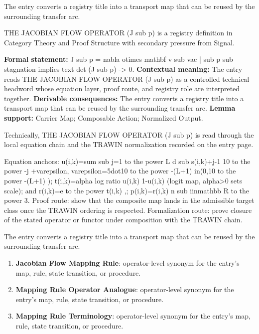 The entry converts a registry title into a transport map that can be reused by the surrounding transfer arc.
\clearpage


\begingroup\small
{}
THE JACOBIAN FLOW OPERATOR (J sub p) is a registry definition in Category Theory and Proof Structure with secondary pressure from Signal.

\begingroup\footnotesize\setlength{\emergencystretch}{3em}\sloppy
\textbf{Formal statement:} J sub p = nabla otimes mathbf v sub vac | sub p sub stagnation implies text det (J sub p) -> 0. \textbf{Contextual meaning:} The entry reads THE JACOBIAN FLOW OPERATOR (J sub p) as a controlled technical headword whose equation layer, proof route, and registry role are interpreted together. \textbf{Derivable consequences:} The entry converts a registry title into a transport map that can be reused by the surrounding transfer arc. \textbf{Lemma support:} Carrier Map; Composable Action; Normalized Output.\par
\endgroup

Technically, THE JACOBIAN FLOW OPERATOR (J sub p) is read through the local equation chain and the TRAWIN normalization recorded on the entry page.

Equation anchors: u(i,k)=sum sub j=1 to the power L d sub s(i,k)+j-1 10 to the power -j +varepsilon, varepsilon=5dot10 to the power -(L+1) in(0,10 to the power -(L+1) ); t(i,k)=alpha log ratio u(i,k) 1-u(i,k) (logit map, alpha>0 sets scale); and r(i,k)=e to the power t(i,k) ,; p(i,k)=r(i,k) n sub iinmathbb R to the power 3. Proof route: show that the composite map lands in the admissible target class once the TRAWIN ordering is respected. Formalization route: prove closure of the stated operator or functor under composition with the TRAWIN chain.

The entry converts a registry title into a transport map that can be reused by the surrounding transfer arc.
\endgroup

\begin{enumerate}[leftmargin=1.6em,itemsep=6pt,topsep=4pt]
\item \textbf{Jacobian Flow Mapping Rule}: operator-level synonym for the entry's map, rule, state transition, or procedure.
\item \textbf{Mapping Rule Operator Analogue}: operator-level synonym for the entry's map, rule, state transition, or procedure.
\item \textbf{Mapping Rule Terminology}: operator-level synonym for the entry's map, rule, state transition, or procedure.
\end{enumerate}

